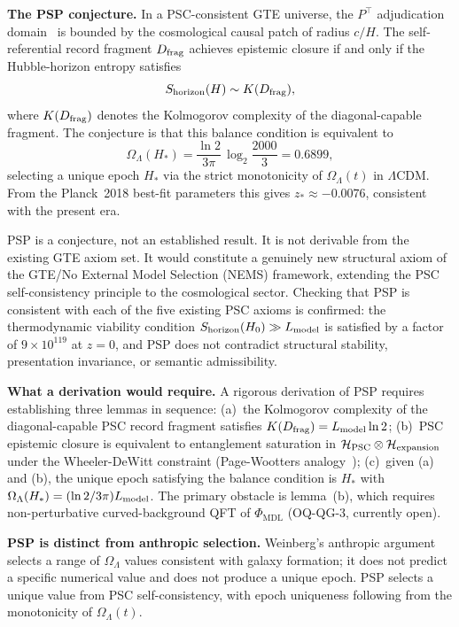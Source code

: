 \documentclass[11pt]{article}
\theoremstyle{remark}
\newcommand{\PHIMDL}{\Phi_{\mathrm{MDL}}}
\newcommand{\Omegalam}{\Omega_\Lambda}
\begin{document}
\smallskip\noindent\textbf{The PSP conjecture.}
In a PSC-consistent GTE universe, the $P^\top$ adjudication
domain~\cite{SpivackBHUnitarity,SpivackPolynomialTransputation} is bounded by the
cosmological causal patch of radius $c/H$.  The self-referential record fragment
$D_{\rm frag}$ achieves epistemic closure if and only if the Hubble-horizon entropy
satisfies
\begin{equation}
  S_{\rm horizon}(H) \sim K(D_{\rm frag}),
  \label{eq:psp_condition}
\end{equation}
where $K(D_{\rm frag})$ denotes the Kolmogorov complexity of the diagonal-capable
fragment.  The conjecture is that this balance condition is equivalent to
\begin{equation}
  \Omegalam(H_*) = \frac{\ln 2}{3\pi}\,\log_2\!\frac{2000}{3} = 0.6899,
  \label{eq:psp}
\end{equation}
selecting a unique epoch $H_*$ via the strict monotonicity of $\Omegalam(t)$ in
$\Lambda$CDM.  From the Planck~2018 best-fit parameters this gives $z_*\approx -0.0076$,
consistent with the present era.

PSP is a conjecture, not an established result.  It is not derivable from the existing
GTE axiom set.  It would constitute a genuinely new structural axiom of the GTE/No External Model Selection (NEMS)
framework, extending the PSC self-consistency principle to the cosmological sector.
Checking that PSP is consistent with each of the five existing PSC axioms is confirmed:
the thermodynamic viability condition $S_{\rm horizon}(H_0)\gg L_{\rm model}$ is
satisfied by a factor of $9\times10^{119}$ at $z=0$, and PSP does not contradict
structural stability, presentation invariance, or semantic admissibility.

\smallskip\noindent\textbf{What a derivation would require.}
A rigorous derivation of PSP requires establishing three lemmas in sequence: (a)~the
Kolmogorov complexity of the diagonal-capable PSC record fragment satisfies
$K(D_{\rm frag}) = L_{\rm model}\ln 2$; (b)~PSC epistemic closure is equivalent to
entanglement saturation in $\mathcal{H}_{\rm PSC}\otimes\mathcal{H}_{\rm expansion}$
under the Wheeler-DeWitt constraint (Page-Wootters analogy~\cite{PageWootters1983}); (c)~given (a) and (b), the
unique epoch satisfying the balance condition is $H_*$ with $\Omegalam(H_*) =
(\ln 2/3\pi)L_{\rm model}$.  The primary obstacle is lemma~(b), which requires
non-perturbative curved-background QFT of $\PHIMDL$ (OQ-QG-3, currently open).

\smallskip\noindent\textbf{PSP is distinct from anthropic selection.}
Weinberg's anthropic argument~\cite{Weinberg1987} selects a range of $\Omegalam$
values consistent with galaxy formation; it does not predict a specific numerical value
and does not produce a unique epoch.  PSP selects a unique value from PSC
self-consistency, with epoch uniqueness following from the monotonicity of $\Omegalam(t)$.
\end{document}
